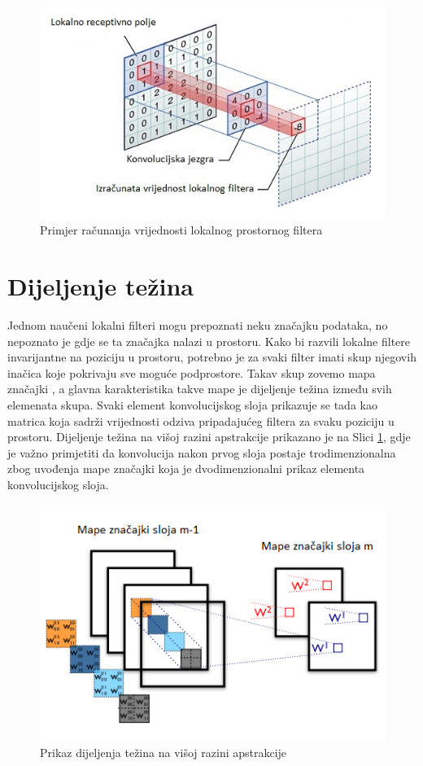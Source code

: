 \documentclass[lmodern, utf8, diplomski, numeric]{fer}
\begin{document}
\begin{figure}[ht!]
\centering
\includegraphics[width=14cm]{slike/kernel_convolution.jpg}
\caption{Primjer računanja vrijednosti lokalnog prostornog filtera}
\end{figure}

\section{Dijeljenje težina}

Jednom naučeni lokalni filteri mogu prepoznati neku značajku podataka, no nepoznato je gdje se ta značajka nalazi u prostoru. Kako bi razvili lokalne filtere invarijantne na poziciju u prostoru, potrebno je za svaki filter imati skup njegovih inačica koje pokrivaju sve moguće podprostore. Takav skup zovemo mapa značajki   , a glavna karakteristika takve mape je dijeljenje težina između svih elemenata skupa. Svaki element konvolucijskog sloja prikazuje se tada kao matrica koja sadrži vrijednosti odziva  pripadajućeg filtera za svaku poziciju u prostoru. Dijeljenje težina na višoj razini apstrakcije prikazano je na Slici \ref{fig:sharedWeights}, gdje je važno primjetiti da konvolucija nakon prvog sloja postaje trodimenzionalna zbog uvođenja mape značajki koja je dvodimenzionalni prikaz elementa konvolucijskog sloja.

\begin{figure}[ht!]
\centering
\includegraphics[width=12cm]{slike/shared_weights.png}
\caption{Prikaz dijeljenja težina na višoj razini apstrakcije}
\label{fig:sharedWeights}
\end{figure}
\end{document}
